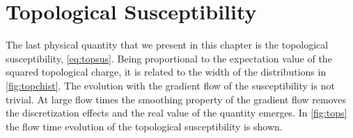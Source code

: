 \section{Topological Susceptibility}
The last physical quantity that we present in this chapter is the topological susceptibility, \cref{eq:topsus}. Being proportional to the expectation value of the squared topological charge, it is related to the width of the distributions in \cref{fig:topchist}. The evolution with the gradient flow of the susceptibility is not trivial. At large flow times the smoothing property of the gradient flow removes the discretization effects and the real value of the quantity emerges. In \cref{fig:tops} the flow time evolution of the topological susceptibility is shown.
 
